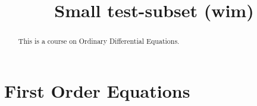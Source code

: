 \documentclass[12pt]{xourse}
\begin{document}

\title{Small test-subset (wim)}{}

\begin{abstract}
This is a course on Ordinary Differential Equations. 
\end{abstract} 

\maketitle

\chapterstyle



\part{First Order Equations}



\end{document}
